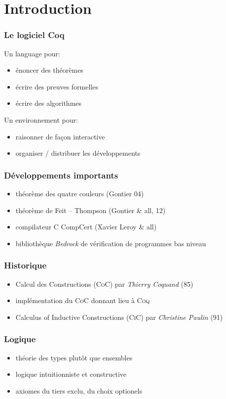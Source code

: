 \section{Introduction}
\begin{frame}
  \frametitle{Le logiciel Coq}
  Un language pour:
  \begin{itemize}
    \item énoncer des théorèmes
    \item écrire des preuves formelles
    \item écrire des algorithmes
  \end{itemize}

  Un environnement pour:
  \begin{itemize}
    \item raisonner de façon interactive
    \item organiser / distribuer les développements
  \end{itemize}
\end{frame}

\begin{frame}
  \frametitle{Développements importants}
  \begin{itemize}
    \item théorème des quatre couleurs (Gontier 04)
    \item théorème de Feit -- Thompson (Gontier \& all, 12)
    \item compilateur \textsc{C} CompCert (Xavier Leroy \& all)
    \item bibliothèque \emph{Bedrock} de vérification de programmes bas niveau
  \end{itemize}
\end{frame}

\begin{frame}
  \frametitle{Historique}
  \begin{itemize}
    \item Calcul des Constructions (\textsc{CoC}) par \emph{Thierry Coquand} (85)
    \item implémentation du \textsc{CoC} donnant lieu à \textsc{Coq}
    \item Calculus of Inductive Constructions (\textsc{CiC}) par \emph{Christine Paulin} (91)
  \end{itemize}
\end{frame}

\begin{frame}
  \frametitle{Logique}
  \begin{itemize}
    \item théorie des types plutôt que ensembles
    \item logique intuitionniste et constructive
    \item axiomes du tiers exclu, du choix optionels
  \end{itemize}
\end{frame}
